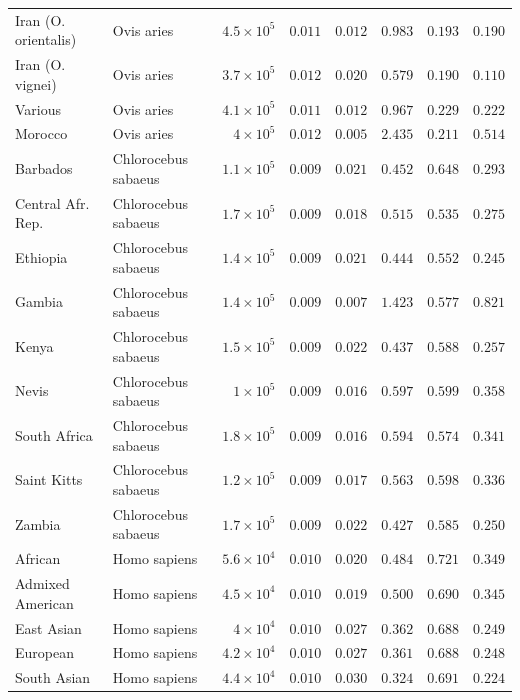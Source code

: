 \documentclass{article}
\begin{document}
\begin{center}
\begin{longtable*}{|l|l|r|r|r|r|r|r|}
            Iran (O. orientalis) & Ovis aries & $4.5\times 10^{5}$ & $ 0.011$ & $ 0.012$ & $ 0.983$ & $ 0.193$ & $ 0.190$ \\
            Iran (O. vignei) & Ovis aries & $3.7\times 10^{5}$ & $ 0.012$ & $ 0.020$ & $ 0.579$ & $ 0.190$ & $ 0.110$ \\
            Various & Ovis aries & $4.1\times 10^{5}$ & $ 0.011$ & $ 0.012$ & $ 0.967$ & $ 0.229$ & $ 0.222$ \\
            Morocco & Ovis aries & $ 4\times 10^{5}$ & $ 0.012$ & $ 0.005$ & $ 2.435$ & $ 0.211$ & $ 0.514$ \\
             Barbados & Chlorocebus sabaeus & $1.1\times 10^{5}$ & $ 0.009$ & $ 0.021$ & $ 0.452$ & $ 0.648$ & $ 0.293$ \\
             Central Afr. Rep. & Chlorocebus sabaeus & $1.7\times 10^{5}$ & $ 0.009$ & $ 0.018$ & $ 0.515$ & $ 0.535$ & $ 0.275$ \\
             Ethiopia & Chlorocebus sabaeus & $1.4\times 10^{5}$ & $ 0.009$ & $ 0.021$ & $ 0.444$ & $ 0.552$ & $ 0.245$ \\
             Gambia & Chlorocebus sabaeus & $1.4\times 10^{5}$ & $ 0.009$ & $ 0.007$ & $ 1.423$ & $ 0.577$ & $ 0.821$ \\
             Kenya & Chlorocebus sabaeus & $1.5\times 10^{5}$ & $ 0.009$ & $ 0.022$ & $ 0.437$ & $ 0.588$ & $ 0.257$ \\
             Nevis & Chlorocebus sabaeus & $ 1\times 10^{5}$ & $ 0.009$ & $ 0.016$ & $ 0.597$ & $ 0.599$ & $ 0.358$ \\
             South Africa & Chlorocebus sabaeus & $1.8\times 10^{5}$ & $ 0.009$ & $ 0.016$ & $ 0.594$ & $ 0.574$ & $ 0.341$ \\
             Saint Kitts & Chlorocebus sabaeus & $1.2\times 10^{5}$ & $ 0.009$ & $ 0.017$ & $ 0.563$ & $ 0.598$ & $ 0.336$ \\
             Zambia & Chlorocebus sabaeus & $1.7\times 10^{5}$ & $ 0.009$ & $ 0.022$ & $ 0.427$ & $ 0.585$ & $ 0.250$ \\
            African & Homo sapiens & $5.6\times 10^{4}$ & $ 0.010$ & $ 0.020$ & $ 0.484$ & $ 0.721$ & $ 0.349$ \\
            Admixed American & Homo sapiens & $4.5\times 10^{4}$ & $ 0.010$ & $ 0.019$ & $ 0.500$ & $ 0.690$ & $ 0.345$ \\
            East Asian & Homo sapiens & $ 4\times 10^{4}$ & $ 0.010$ & $ 0.027$ & $ 0.362$ & $ 0.688$ & $ 0.249$ \\
            European & Homo sapiens & $4.2\times 10^{4}$ & $ 0.010$ & $ 0.027$ & $ 0.361$ & $ 0.688$ & $ 0.248$ \\
            South Asian & Homo sapiens & $4.4\times 10^{4}$ & $ 0.010$ & $ 0.030$ & $ 0.324$ & $ 0.691$ & $ 0.224$ \\
        \end{longtable*}
    \end{center}
\end{document}
